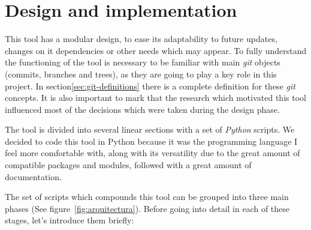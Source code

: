 \documentclass[a4paper, 12pt]{book}
\begin{document}
\chapter{Design and implementation}
\label{sec:design-implementation}
This tool has a modular design, to ease its adaptability to future updates, changes on it dependencies or other needs which may appear.
To fully understand the functioning of the tool is necessary to be familiar with main \emph{git} objects (commits, branches and trees),
as they are going to play a key role in this project. In section\ref{sec:git-definitions} there is a complete definition for these \emph{git} concepts.
It is also important to mark that the research which motivated this tool influenced most of the decisions which were taken during the design phase.\par
The tool is divided into several linear sections with a set of \emph{Python} scripts. We decided to code this tool in Python because it was the programming
language I feel more comfortable with, along with its versatility due to the great amount of compatible packages and modules, followed
with a great amount of documentation.\par
The set of scripts which compounds this tool can be grouped into three main phases (See figure~\ref{fig:arquitectura}).
Before going into detail in each of these stages, let's introduce them briefly:
\end{document}
